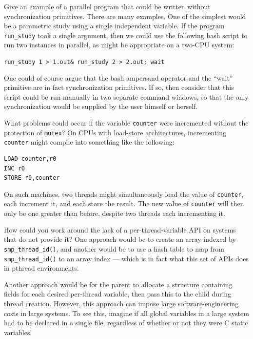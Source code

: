 \QuickQ{}
	Give an example of a parallel program that could be written
	without synchronization primitives.
\QuickA{}
	There are many examples.
	One of the simplest would be a parametric study using a
	single independent variable.
	If the program {\tt run\_study} took a single argument,
	then we could use the following bash script to run two
	instances in parallel, as might be appropriate on a
	two-CPU system:

	{ \scriptsize \tt run\_study 1 > 1.out\& run\_study 2 > 2.out; wait}

	One could of course argue that the bash ampersand operator and
	the ``wait'' primitive are in fact synchronization primitives.
	If so, then consider that
	this script could be run manually in two separate
	command windows, so that the only synchronization would be
	supplied by the user himself or herself.

\QuickQ{}
	What problems could occur if the variable {\tt counter} were
	incremented without the protection of {\tt mutex}?
\QuickA{}
	On CPUs with load-store architectures, incrementing {\tt counter}
	might compile into something like the following:

\vspace{5pt}
\begin{minipage}[t]{\columnwidth}
\small
\begin{verbatim}
LOAD counter,r0
INC r0
STORE r0,counter
\end{verbatim}
\end{minipage}
\vspace{5pt}

	On such machines, two threads might simultaneously load the
	value of {\tt counter}, each increment it, and each store the
	result.
	The new value of {\tt counter} will then only be one greater
	than before, despite two threads each incrementing it.

\QuickQ{}
	How could you work around the lack of a per-thread-variable
	API on systems that do not provide it?
\QuickA{}
	One approach would be to create an array indexed by
	{\tt smp\_thread\_id()}, and another would be to use a hash
	table to map from {\tt smp\_thread\_id()} to an array
	index --- which is in fact what this
	set of APIs does in pthread environments.

	Another approach would be for the parent to allocate a structure
	containing fields for each desired per-thread variable, then
	pass this to the child during thread creation.
	However, this approach can impose large software-engineering
	costs in large systems.
	To see this, imagine if all global variables in a large system
	had to be declared in a single file, regardless of whether or
	not they were C static variables!

